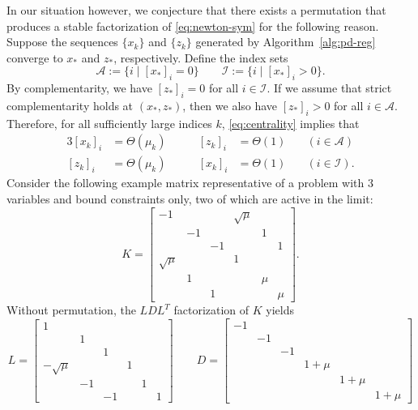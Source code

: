 \documentclass{amsart}
\begin{document}
In our situation however, we conjecture that there exists a permutation that
produces a stable factorization of \eqref{eq:newton-sym} for the following
reason. Suppose the sequences $\{x_k\}$ and $\{z_k\}$ generated by
Algorithm~\ref{alg:pd-reg} converge to $x_*$ and $z_*$, respectively. Define
the index sets
\[
  \mathcal{A} := \{ i \mid [x_*]_i = 0 \} \qquad
  \mathcal{I} := \{ i \mid [x_*]_i > 0 \}.
\]
By complementarity, we have $[z_*]_i = 0$ for all $i \in \mathcal{I}$. If we
assume that strict complementarity holds at $(x_*, z_*)$, then we also have
$[z_*]_i > 0$ for all $i \in \mathcal{A}$. Therefore, for all sufficiently
large indices $k$, \eqref{eq:centrality} implies that
\begin{alignat}{3}
  [x_k]_i & = \Theta(\mu_k) \qquad & [z_k]_i & = \Theta(1) \quad &
  (i \in \mathcal{A}) \\
  [z_k]_i & = \Theta(\mu_k) \qquad & [x_k]_i & = \Theta(1) \quad &
  (i \in \mathcal{I}).
\end{alignat}
Consider the following example matrix representative of a problem with $3$
variables and bound constraints only, two of which are active in the limit:
\[
  K =
  \begin{bmatrix}
    -1          &    &    & \sqrt{\mu} &     &   \\
                & -1 &    &            & 1   &   \\
                &    & -1 &            &     & 1 \\
     \sqrt{\mu} &    &    & 1          &     &   \\
                &  1 &    &            & \mu &   \\
                &    &  1 &            &     & \mu
  \end{bmatrix}.
\]
Without permutation, the $LDL^T$ factorization of $K$ yields
\[
  L =
  \begin{bmatrix}
    1 &&&&& \\
    & 1 &&&& \\
    && 1 &&& \\
    -\sqrt{\mu} &&& 1 && \\
    & -1 &&& 1 & \\
    && -1 &&& 1
  \end{bmatrix}
  \qquad
  D =
  \begin{bmatrix}
    -1 &&&&& \\
    & -1 &&&& \\
    && -1 &&& \\
    &&& 1+\mu && \\
    &&&& 1+\mu & \\
    &&&&& 1+\mu
  \end{bmatrix}
\]
\end{document}
